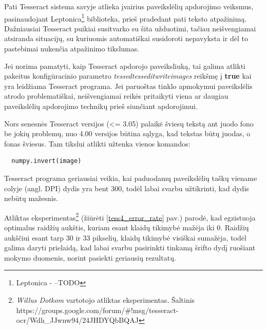\documentclass{VUMIFInfBakalaurinis}
\begin{document}
Pati Tesseract sistema savyje atlieka įvairius paveikslėlių apdorojimo veiksmus, pasinaudojant Leptonica\footnote{Leptonica - --TODO} biblioteka, prieš pradedant pati teksto atpažinimą.
Dažniausiai Tesseract puikiai susitvarko su šita užduotimi, tačiau neišvengiamai atsiranda situacijų, su kuriuomis automatiškai susidoroti nepavyksta ir dėl to pastebimai nukenčia
atpažinimo tikslumas.

Jei norima pamatyti, kaip Tesseract apdorojo paveiksliuką, tai galima atlikti pakeitus konfigūracinio parametro \textit{tessedtessedit\textunderscore write\textunderscore images} reikšmę į \textbf{true}
kai yra leidžiama Tesseract programa. Jei paruoštas tinklo apmokymui paveikslėlis atrodo problematiškai, neišvengiamai reikės pritaikyti viena ar daugiau paveikslėlių apdorojimo technikų
prieš siunčiant apdorojimui.

Nors senesnės Tesseract versijos (<= 3.05) palaikė šviesų tekstą ant juodo fono be jokių problemų, nuo 4.00 versijos būtina sąlyga, kad tekstas būtų juodas, o fonas šviesus.
Tam tikslui atlikti užtenka vienos komandos:
\begin{verbatim}
  numpy.invert(image)
\end{verbatim}

Tesseract programa geriausiai veikia, kai paduodamų paveikslėlių taškų viename colyje (angl. DPI) dydis yra bent 300, todėl labai svarbu užtikrinti, kad dydis nebūtų mažesnis.

Atliktas eksperimentas\footnote{\textit{Willus Dotkom} vartotojo atliktas eksperimentas. Šaltinis https://groups.google.com/forum/\#!msg/tesseract-ocr/Wdh\_JJwnw94/24JHDYQbBQAJ}
(žiūrėti \ref{tess4_error_rate} pav.) parodė, kad egzistuoja optimalus raidžių aukštis, kuriam esant klaidų tikimybė mažėja iki 0. Raidžių aukščiui esant tarp 30 ir 33 pikselių, klaidų tikimybė visiškai sumažėja,
todėl galima daryti prielaidą, kad labai svarbu pasirinkti tinkamą šrifto dydį ruošiant mokymo duomenis, norint pasiekti geriausių rezultatų.
\end{document}
